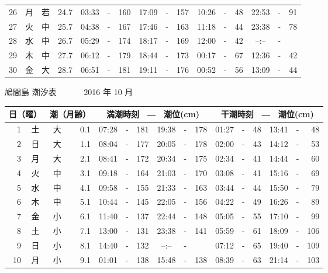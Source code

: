 \documentclass[12pt.a4j]{jsarticle}
\begin{document}
\begin{center}
\begin{table}[ht]
\begin{tabular}{|rc|cr|ccrccr|ccrccr|}
26 & 月 & 若 & 24.7 &  03:33 &-& 160  &  17:09 &-& 157  &   10:26 &-&  48  &   22:53 &-&  91  \\
27 & 火 & 中 & 25.7 &  04:38 &-& 167  &  17:46 &-& 163  &   11:18 &-&  44  &   23:38 &-&  78  \\
28 & 水 & 中 & 26.7 &  05:29 &-& 174  &  18:17 &-& 169  &   12:00 &-&  42  &   --:-- &-&     \\
29 & 木 & 中 & 27.7 &  06:12 &-& 179  &  18:44 &-& 173  &   00:17 &-&  67  &   12:36 &-&  42  \\
30 & 金 & 大 & 28.7 &  06:51 &-& 181  &  19:11 &-& 176  &   00:52 &-&  56  &   13:09 &-&  44  \\
   \hline
   \end{tabular}
\end{table}
\newpage
 {\LARGE 鳩間島  潮汐表　　　}
 {\large 2016 年 10 月}\\
 \begin{table}[ht]
    \begin{tabular}{|rc|cr|ccrccr|ccrccr|}
    \hline
    \multicolumn{2}{|c|}{日（曜）} & \multicolumn{2}{c|}{潮（月齢）} & \multicolumn{6}{c|}{満潮時刻　―　潮位(cm)} & \multicolumn{6}{c|}{干潮時刻　―　潮位(cm)} \\
 \hline
 1 & 土 & 大 &  0.1 &  07:28 &-& 181  &  19:38 &-& 178  &   01:27 &-&  48  &   13:41 &-&  48  \\
 2 & 日 & 大 &  1.1 &  08:04 &-& 177  &  20:05 &-& 178  &   02:00 &-&  43  &   14:12 &-&  53  \\
 3 & 月 & 大 &  2.1 &  08:41 &-& 172  &  20:34 &-& 175  &   02:34 &-&  41  &   14:44 &-&  60  \\
 4 & 火 & 中 &  3.1 &  09:18 &-& 164  &  21:03 &-& 170  &   03:08 &-&  41  &   15:16 &-&  69  \\
 5 & 水 & 中 &  4.1 &  09:58 &-& 155  &  21:33 &-& 163  &   03:44 &-&  44  &   15:50 &-&  79  \\
 6 & 木 & 中 &  5.1 &  10:44 &-& 145  &  22:05 &-& 156  &   04:22 &-&  49  &   16:26 &-&  89  \\
 7 & 金 & 小 &  6.1 &  11:40 &-& 137  &  22:44 &-& 148  &   05:05 &-&  55  &   17:10 &-&  99  \\
 8 & 土 & 小 &  7.1 &  13:00 &-& 131  &  23:38 &-& 141  &   05:59 &-&  61  &   18:09 &-& 106  \\
 9 & 日 & 小 &  8.1 &  14:40 &-& 132  &  --:-- &-&     &   07:12 &-&  65  &   19:40 &-& 109  \\
10 & 月 & 小 &  9.1 &  01:01 &-& 138  &  15:48 &-& 138  &   08:39 &-&  63  &   21:14 &-& 103  \\

\end{tabular}
\end{table}
\end{center}
\end{document}
